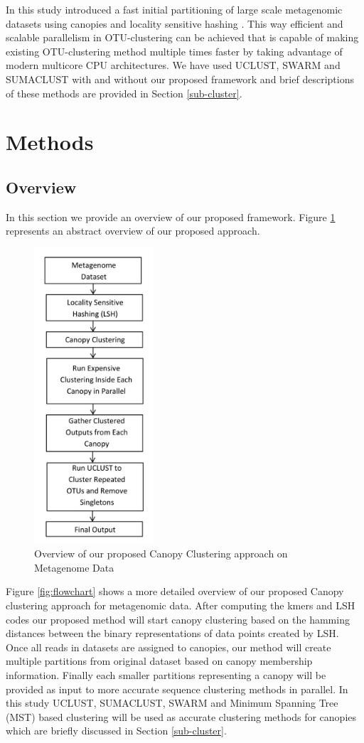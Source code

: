 \documentclass[10pt, conference, compsocconf]{IEEEtran}
\begin{document}
In 
this study introduced a  fast initial partitioning of 
large scale metagenomic datasets using canopies  \cite{MARCanopy} and locality sensitive hashing 
\cite{MARLshRef1}. This way efficient and scalable parallelism in OTU-clustering can be achieved that
is capable of making existing OTU-clustering
method multiple times faster by taking advantage of modern multicore CPU architectures. We have used UCLUST, SWARM and SUMACLUST with and without our proposed framework and brief descriptions of these methods are provided in Section \ref{sub-cluster}.

\section{Methods}
\label{featMethod}
\subsection{\textbf{Overview}}
In this section we provide an overview of our proposed framework. Figure \ref{fig:overall} represents an abstract overview of our proposed approach.

\begin{figure}
	\centering
	\includegraphics[width=0.5\linewidth,height=11cm]{overall.jpg}	
	\caption{Overview of our proposed Canopy Clustering approach on Metagenome Data}
	\label{fig:overall}
\end{figure} 

Figure \ref{fig:flowchart} shows a more detailed overview of our proposed Canopy clustering approach for metagenomic data. After computing the kmers and LSH codes our proposed method will start canopy clustering based on the hamming distances between the binary representations of data points created by LSH. Once all reads in datasets are assigned to canopies, our method will create multiple partitions from original dataset based on canopy membership information. Finally each smaller partitions representing a canopy will be provided as input to more accurate sequence clustering methods in parallel. In this study UCLUST, SUMACLUST, SWARM and Minimum Spanning Tree (MST) based clustering will be used as accurate clustering methods for canopies which are briefly discussed in Section \ref{sub-cluster}.
\end{document}
